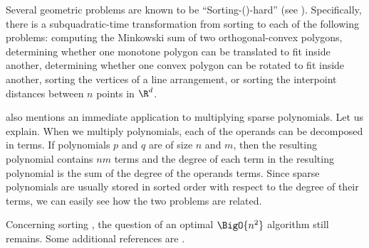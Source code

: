 Several geometric problems are known to be ``Sorting-(\XY)-hard'' (see
\citet*{barrera1996finding,barequet2001polygon}). Specifically, there
is a subquadratic-time transformation from sorting \XY to each of the
following problems: computing the Minkowski sum of two orthogonal-convex
polygons, determining whether one monotone polygon can be translated to fit
inside another, determining whether one convex polygon can be rotated to fit
inside another, sorting the vertices of a line arrangement, or sorting the
interpoint distances between $n$ points in $\R^d$.

\citet*{fredman:1976} also mentions an immediate application to multiplying
sparse polynomials. Let us explain. When we multiply polynomials, each of the
operands can be decomposed in terms. If polynomials $p$ and $q$ are of size $n$
and $m$, then the resulting polynomial contains $nm$ terms and the degree of
each term in the resulting polynomial is the sum of the degree of the operands
terms. Since sparse polynomials are usually stored in sorted order with respect
to the degree of their terms, we can easily see how the two problems are
related.

Concerning sorting \XY, the question of an optimal $\BigO{n^2}$ algorithm still
remains. Some additional references are \citet*{
harper:1975,
kahn:1995,
dietzfelbinger1989lower,
steiger1995pseudo,
lambert:1990,
erickson:1999,
bremner2012necklaces,
orourke:2012:sortxy}.
